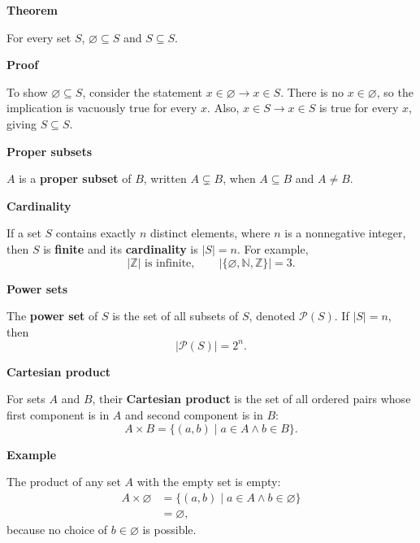 \documentclass[letterpaper]{article}
\newcommand{\noteheader}[1]{\par\bigskip\noindent\textbf{#1}\par\medskip}
\begin{document}
\clearpage

\noteheader{Theorem}

For every set $S$, $\varnothing\subseteq S$ and $S\subseteq S$.

\noteheader{Proof}

To show $\varnothing\subseteq S$, consider the statement
$x\in\varnothing\to x\in S$. There is no $x\in\varnothing$, so the
implication is vacuously true for every $x$. Also, $x\in S\to x\in S$
is true for every $x$, giving $S\subseteq S$.

\noteheader{Proper subsets}

$A$ is a \textbf{proper subset} of $B$, written $A\subsetneq B$, when
$A\subseteq B$ and $A\ne B$.

\noteheader{Cardinality}

If a set $S$ contains exactly $n$ distinct elements, where $n$ is a
nonnegative integer, then $S$ is \textbf{finite} and its
\textbf{cardinality} is $|S|=n$. For example,
\[
|\mathbb Z|\text{ is infinite},
\qquad
\bigl|\{\varnothing,\mathbb N,\mathbb Z\}\bigr|=3.
\]

\noteheader{Power sets}

The \textbf{power set} of $S$ is the set of all subsets of $S$, denoted
$\mathcal P(S)$. If $|S|=n$, then
\[
|\mathcal P(S)|=2^n.
\]

\clearpage

\noteheader{Cartesian product}

For sets $A$ and $B$, their \textbf{Cartesian product} is the set of all
ordered pairs whose first component is in $A$ and second component is in $B$:
\[
A\times B=\{(a,b)\mid a\in A\land b\in B\}.
\]

\noteheader{Example}

The product of any set $A$ with the empty set is empty:
\begin{align*}
A\times\varnothing
&=\{(a,b)\mid a\in A\land b\in\varnothing\}\\
&=\varnothing,
\end{align*}
because no choice of $b\in\varnothing$ is possible.
\end{document}
